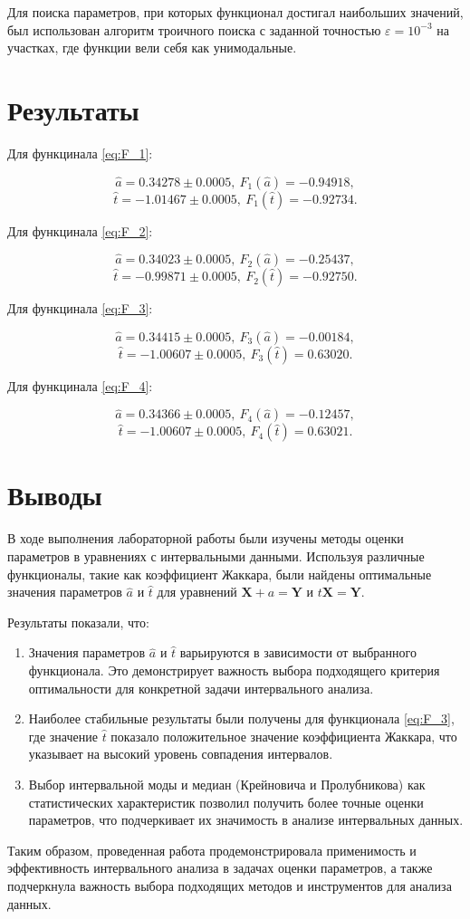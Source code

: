 \documentclass{article}
\begin{document}
  Для поиска параметров, при которых функционал достигал наибольших
  значений, был использован алгоритм троичного поиска с заданной точностью
  \( \varepsilon = 10^{-3} \) на участках, где функции вели
  себя как унимодальные.

  \section{Результаты}

  Для функцинала \ref{eq:F_1}:

  \[ \hat a = 0.34278 \pm 0.0005, \ F_1 (\hat a) = -0.94918, \]
  \[ \hat t = -1.01467 \pm 0.0005, \ F_1 (\hat t) = -0.92734. \]

  Для функцинала \ref{eq:F_2}:

  \[ \hat a = 0.34023 \pm 0.0005, \ F_2 (\hat a) = -0.25437, \]
  \[ \hat t = -0.99871 \pm 0.0005, \ F_2 (\hat t) = -0.92750. \]

  Для функцинала \ref{eq:F_3}:

  \[ \hat a = 0.34415 \pm 0.0005, \ F_3 (\hat a) = -0.00184, \]
  \[ \hat t = -1.00607 \pm 0.0005, \ F_3 (\hat t) = 0.63020. \]

  Для функцинала \ref{eq:F_4}:

  \[ \hat a = 0.34366 \pm 0.0005, \ F_4 (\hat a) = -0.12457, \]
  \[ \hat t = -1.00607 \pm 0.0005, \ F_4 (\hat t) = 0.63021. \]

  \section{Выводы}

  В ходе выполнения лабораторной работы были изучены методы оценки
  параметров в уравнениях с интервальными данными. Используя различные
  функционалы, такие как коэффициент Жаккара, были найдены оптимальные
  значения параметров \( \hat a \) и \( \hat t \) для уравнений
  \( \mathbf{X} + a = \mathbf{Y} \) и \( t\mathbf{X} = \mathbf{Y} \).

  Результаты показали, что:

  \begin{enumerate}
    \item Значения параметров \( \hat a \) и \( \hat t \) варьируются в
      зависимости от выбранного функционала. Это демонстрирует важность
      выбора подходящего критерия оптимальности для конкретной задачи
      интервального анализа.
    \item Наиболее стабильные результаты были получены для функционала
      \ref{eq:F_3}, где значение \( \hat t \) показало положительное
      значение коэффициента Жаккара, что указывает на высокий уровень
      совпадения интервалов.
    \item Выбор интервальной моды и медиан (Крейновича и Пролубникова) как
      статистических характеристик позволил получить более точные оценки
      параметров, что подчеркивает их значимость в анализе интервальных
      данных.
  \end{enumerate}

  Таким образом, проведенная работа продемонстрировала применимость и
  эффективность интервального анализа в задачах оценки параметров, а также
  подчеркнула важность выбора подходящих методов и инструментов для
  анализа данных.
\end{document}
